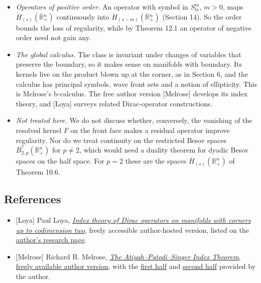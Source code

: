 \documentclass[
  11pt,
]{article}
\providecommand{\tightlist}{%
  \setlength{\itemsep}{0pt}\setlength{\parskip}{0pt}}
\begin{document}
\begin{itemize}
\tightlist
\item
  \emph{Operators of positive order.} An operator with symbol in
  \(S^m_{\mathrm{la}}\), \(m>0\), maps
  \(\dot H_{(s)}(\overline{\mathbb R}{}^n_+)\) continuously into
  \(\dot H_{(s-m)}(\overline{\mathbb R}{}^n_+)\) (Section 14). So the
  order bounds the loss of regularity, while by Theorem 12.1 an operator
  of negative order need not gain any.
\item
  \emph{The global calculus.} The class is invariant under changes of
  variables that preserve the boundary, so it makes sense on manifolds
  with boundary. Its kernels live on the product blown up at the corner,
  as in Section 6, and the calculus has principal symbols, wave front
  sets and a notion of ellipticity. This is Melrose's b-calculus. The
  free author version {[}Melrose{]} develops its index theory, and
  {[}Loya{]} surveys related Dirac-operator constructions.
\item
  \emph{Not treated here.} We do not discuss whether, conversely, the
  vanishing of the resolved kernel \(F\) on the front face makes a
  residual operator improve regularity. Nor do we treat continuity on
  the restricted Besov spaces \(\overline B^s_{2,p}(\mathbb R^n_+)\) for
  \(p\neq2\), which would need a duality theorem for dyadic Besov spaces
  on the half space. For \(p=2\) these are the spaces
  \(\overline H_{(s)}(\mathbb R^n_+)\) of Theorem 10.6.
\end{itemize}

\subsection{References}\label{references}

\begin{itemize}
\tightlist
\item
  {[}Loya{]} Paul Loya,
  \href{https://people.math.binghamton.edu/loya/papers/bpag-art.pdf}{\emph{Index
  theory of Dirac operators on manifolds with corners up to codimension
  two}}, freely accessible author-hosted version, listed on the
  \href{https://people.math.binghamton.edu/loya/research.html}{author's
  research page}.
\item
  {[}Melrose{]} Richard B. Melrose,
  \href{https://math.mit.edu/~rbm/tapsit.html}{\emph{The
  Atiyah--Patodi--Singer Index Theorem}, freely available author
  version}, with the \href{https://math.mit.edu/~rbm/tapsit1.ps}{first
  half} and \href{https://math.mit.edu/~rbm/tapsit2.ps}{second half}
  provided by the author.
\end{itemize}
\end{document}
